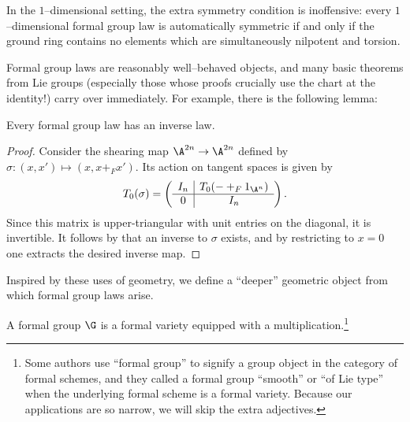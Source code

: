 \begin{remark}
In the $1$--dimensional setting, the extra symmetry condition is inoffensive: every $1$--dimensional formal group law is automatically symmetric if and only if the ground ring contains no elements which are simultaneously nilpotent and torsion.
\end{remark}

Formal group laws are reasonably well--behaved objects, and many basic theorems from Lie groups (especially those whose proofs crucially use the chart at the identity!) carry over immediately.  For example, there is the following lemma:

\begin{lemma}
Every formal group law has an inverse law.
\end{lemma}
\begin{proof}
Consider the shearing map $\A^{2n} \to \A^{2n}$ defined by $\sigma: (x, x') \mapsto (x, x +_F x')$.  Its action on tangent spaces is given by \[T_0 (\sigma) = \left( \begin{array}{c|c} I_n & T_0( - +_F 1_{\A^n} ) \\ \hline 0 & I_n \end{array} \right).\]  Since this matrix is upper-triangular with unit entries on the diagonal, it is invertible.  It follows by  that an inverse to $\sigma$ exists, and by restricting to $x = 0$ one extracts the desired inverse map.
\end{proof}

Inspired by these uses of geometry, we define a ``deeper'' geometric object from which formal group laws arise.
\begin{definition}
A formal group $\G$ is a formal variety equipped with a multiplication.\footnote{Some authors use ``formal group'' to signify a group object in the category of formal schemes, and they called a formal group ``smooth'' or ``of Lie type'' when the underlying formal scheme is a formal variety.  Because our applications are so narrow, we will skip the extra adjectives.}
\end{definition}

